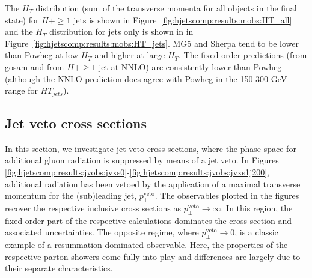 The $H_T$ distribution (sum of the transverse momenta for all objects
in the final state) for $H+\ge1$ jets is shown in
Figure~\ref{fig:hjetscomp:results:mobs:HT_all} and the $H_T$
distribution for jets only is shown in in
Figure~\ref{fig:hjetscomp:results:mobs:HT_jets}. 
MG5 and Sherpa tend to be lower than Powheg at low $H_T$ and higher at
large $H_T$. The fixed order predictions (from gosam and from $H+\ge1$
jet at NNLO) are consistently lower than Powheg (although the NNLO
prediction does agree with Powheg in the 150-300 GeV range for
$HT_{jets}$).



\clearpage
\subsection{Jet veto cross sections}
\label{sec:hjetscomp:results:jvobs}


In this section, we investigate jet veto cross sections, where the phase space for
additional gluon radiation is suppressed by means of a jet veto. 
In  Figures 
\ref{fig:hjetscomp:results:jvobs:jvxs0}-\ref{fig:hjetscomp:results:jvobs:jvxs1j200}, 
additional radiation has been vetoed by the application of a maximal transverse 
momentum for the (sub)leading jet, $p_\perp^\text{veto}$. The observables plotted
in the figures recover the respective inclusive cross sections as 
$p_\perp^\text{veto}\to\infty$. In this region, the fixed order 
part of the respective calculations dominates the cross section 
and associated uncertainties. The opposite regime, where $p_\perp^\text{veto}\to 0$, 
is a classic example of a resummation-dominated observable. Here, the 
properties of the respective parton showers come fully into play and 
differences are largely due to their separate characteristics. 

